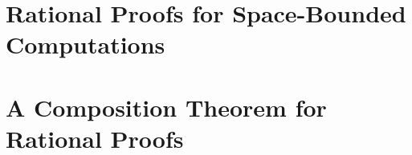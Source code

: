 	
%	
	
	
	
	
	
	\section{Rational Proofs for Space-Bounded Computations }
	
	
	\section{A Composition Theorem for Rational Proofs}
	
		
				
	
	
	
	
	
	
	
	
	
	
%
%

%
%
%
%
